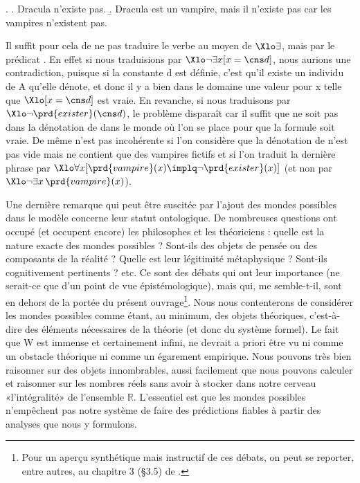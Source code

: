 \ex.
\a. Dracula n'existe pas.
\b. Dracula est un vampire, mais il n'existe pas car les vampires n'existent pas.

Il suffit pour cela de ne pas traduire le verbe  au moyen de $\Xlo\exists$, mais par le prédicat .  En effet si nous traduisions \Last[a] par \(\Xlo\neg\exists x [x=\cns d]\), nous aurions une contradiction, puisque si la constante \cns d est définie, c'est qu'il existe un individu de \Unv A qu'elle dénote, et donc il y a bien dans le domaine une valeur pour \vrb x telle que \(\Xlo[x=\cns d]\) est vraie. En revanche, si nous traduisons \Last[a] par \(\Xlo\neg\prd{exister}(\cns d)\), le problème disparaît car il suffit que  ne soit pas dans la dénotation de  dans le monde où l'on se place pour que la formule soit vraie.  De même \Last[b] n'est pas incohérente si l'on considère que la dénotation de  n'est pas vide mais ne contient que des vampires fictifs et si l'on traduit la dernière phrase  par \(\Xlo\forall x [\prd{vampire}(x)\implq \neg\prd{exister}(x)]\) (et non par \(\Xlo\neg\exists x\, \prd{vampire}(x)\)). 

\medskip

Une dernière remarque qui peut être suscitée par l'ajout des mondes possibles dans le modèle concerne leur statut ontologique.  De nombreuses questions ont occupé (et occupent encore) les philosophes et les théoriciens : quelle est la nature exacte des mondes possibles ? Sont-ils des objets de pensée %
ou des composants de la réalité ? Quelle est leur légitimité métaphysique ? Sont-ils cognitivement pertinents ? %
etc.
Ce sont des débats qui ont leur importance (ne serait-ce que d'un point de vue épistémologique), mais qui, me semble-t-il, sont en dehors de la portée du présent ouvrage\footnote{Pour un aperçu synthétique mais instructif de ces débats, on peut se reporter, entre autres, au chapitre 3 (\S3.5) de \citet{Gamut:2}.}.  Nous nous contenterons de considérer les mondes possibles comme étant, au minimum, des objets théoriques, c'est-à-dire des éléments nécessaires de la théorie (et donc du système formel). Le fait que \Unv W est immense et certainement infini, ne devrait {a priori} être vu ni comme un obstacle théorique ni comme un égarement empirique. Nous pouvons très bien raisonner sur des objets innombrables, aussi facilement que nous pouvons calculer et raisonner sur les nombres réels sans avoir à stocker dans notre cerveau «l'intégralité» de l'ensemble $\mathbb R$.
L'essentiel est que les mondes possibles n'empêchent pas notre système de faire des prédictions fiables à partir des analyses que nous y formulons.

